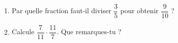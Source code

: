 \bigskip
{}
 
\begin{enumerate}[leftmargin=*,align=parleft, label=\alph*), itemsep=9pt]
\item Par quelle fraction faut-il diviser $\dfrac{3}{5}$ pour obtenir $\dfrac{9}{10}$ ?
\item Calcule $\dfrac{7}{11} \cdot \dfrac{11}{7}$. Que remarques-tu ?
\end{enumerate}
 
 